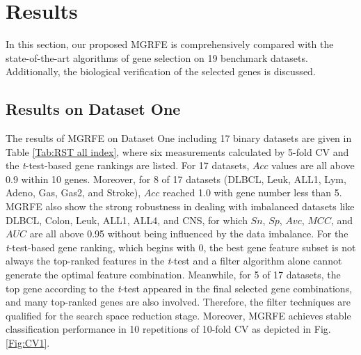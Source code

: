 \documentclass[10pt,journal,compsoc]{IEEEtran}
\begin{document}
	\section{Results}
	
	In this section, our proposed MGRFE is comprehensively compared with the state-of-the-art algorithms of gene selection on 19 benchmark datasets.
	Additionally, the biological verification of the selected genes is discussed.
	
	\subsection{Results on Dataset One}
	 
	The results of MGRFE on Dataset One including 17 binary datasets are given in Table \ref{Tab:RST all index}, where six measurements calculated by 5-fold CV and the \textit{t}-test-based gene rankings are listed. For 17 datasets, \(Acc\) values are all above 0.9 within 10 genes. Moreover, for 8 of 17 datasets (DLBCL, Leuk, ALL1, Lym, Adeno, Gas, Gas2, and Stroke), \(Acc\) reached 1.0 with gene number less than 5. MGRFE also show the strong robustness in dealing with imbalanced datasets like DLBCL, Colon, Leuk, ALL1, ALL4, and CNS, for which \(Sn\), \(Sp\), \(Avc\), \(MCC\), and \(AUC\) are all above 0.95 without being influenced by the data imbalance. For the \textit{t}-test-based gene ranking, which begins with 0, the best gene feature subset is not always the top-ranked features in the \textit{t}-test and a filter algorithm alone cannot generate the optimal feature combination. Meanwhile, for 5 of 17 datasets, the top gene according to the \textit{t}-test appeared in the final selected gene combinations, and many top-ranked genes are also involved. Therefore, the filter techniques are qualified for the search space reduction stage. Moreover, MGRFE achieves stable classification performance in 10 repetitions of 10-fold CV as depicted in Fig. \ref{Fig:CV1}.
	
\end{document}
